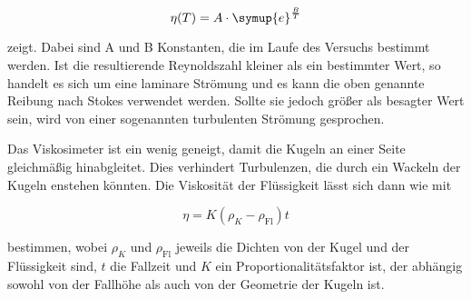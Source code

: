 \begin{equation}
\label{eqn:tempabhaengig}
    \eta (T) = A \cdot \symup{e}^\frac{B}{T}
\end{equation}

zeigt. Dabei sind A und B Konstanten, die im Laufe des Versuchs bestimmt werden. 
Ist die resultierende Reynoldszahl kleiner als ein bestimmter Wert, so handelt es sich um eine laminare Strömung und es kann die oben genannte Reibung nach Stokes verwendet werden.
Sollte sie jedoch größer als besagter Wert sein, wird von einer sogenannten turbulenten Strömung gesprochen. 

Das Viskosimeter ist ein wenig geneigt, damit die Kugeln an einer Seite gleichmäßig hinabgleitet. 
Dies verhindert Turbulenzen, die durch ein Wackeln der Kugeln enstehen könnten.
Die Viskosität der Flüssigkeit lässt sich dann wie mit

\begin{equation}
\label{eqn:viskositaet}
    \eta = K (\rho_K - \rho_\text{Fl}) t
\end{equation}

bestimmen, wobei $\rho_K$ und $\rho_\text{Fl}$ jeweils die Dichten von der Kugel und der Flüssigkeit sind, $t$ die Fallzeit und $K$ ein Proportionalitätsfaktor ist, der abhängig sowohl von der Fallhöhe als auch von der Geometrie der Kugeln ist.
